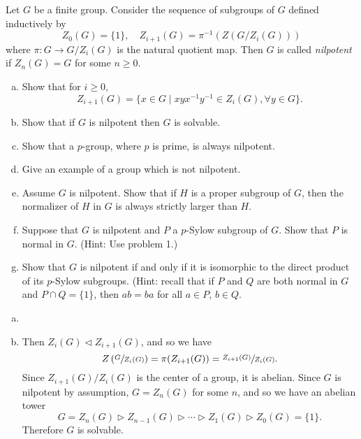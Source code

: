 \documentclass{article}
\newcounter{Problem}
\newenvironment{Problem}{\begin{Exercise}[name={Problem},
                                          counter={Problem}]}
                        {\end{Exercise}}
\begin{document}
\begin{Problem}
Let $G$ be a finite group. Consider the sequence of subgroups of $G$
defined inductively by
$$
Z_0(G) = \{ 1 \}, \quad
Z_{i+1}(G) = \pi^{-1}(Z(G/Z_i(G)))
$$
where $\pi : G \to G / Z_i(G)$ is the natural quotient map. Then $G$
is called \emph{nilpotent} if $Z_n(G) = G$ for some $n \geq 0$.

\begin{enumerate}[(a)]
  \item{
    Show that for $i \geq 0$,
    $$
    Z_{i+1}(G) = \{ x \in G
                   \mid
                   xyx^{-1}y^{-1} \in Z_i(G), \forall y \in G
                \}.
    $$
  }
  \item{
    Show that if $G$ is nilpotent then $G$ is solvable.
  }
  \item{
    Show that a $p$-group, where $p$ is prime, is always nilpotent.
  }
  \item{
    Give an example of a group which is not nilpotent.
  }
  \item{
    Assume $G$ is nilpotent. Show that if $H$ is a proper subgroup of $G$, then
    the normalizer of $H$ in $G$ is always strictly larger than $H$.
  }
  \item{
    Suppose that $G$ is nilpotent and $P$ a $p$-Sylow subgroup of
    $G$. Show that $P$ is normal in $G$. (Hint: Use problem 1.)
  }
  \item{
    Show that $G$ is nilpotent if and only if it is isomorphic to the
    direct product of its $p$-Sylow subgroups. (Hint: recall that if
    $P$ and $Q$ are both normal in $G$ and $P \cap Q = \{ 1 \}$, then
    $ab = ba$ for all $a \in P$, $b \in Q$.
  }
\end{enumerate}
\end{Problem}

\begin{Answer}
\begin{enumerate}[(a)]
  \item{
  }
  \item{


    Then $Z_{i}(G) \triangleleft Z_{i+1}(G)$, and so we have
    $$
      Z\left(\sfrac{G}{Z_{i}(G)}\right)
    = \pi(Z_{i+1}(G))
    = \sfrac{Z_{i+1}(G)}{Z_{i}(G)}.
    $$
    Since $Z_{i+1}(G) / Z_{i}(G)$ is the center of a group, it is
    abelian. Since $G$ is nilpotent by assumption, $G = Z_n(G)$ for
    some $n$, and so we have an abelian tower
    $$
    G = Z_n(G)
    \triangleright Z_{n-1}(G)
    \triangleright \cdots
    \triangleright Z_1(G)
    \triangleright Z_0(G) = \{ 1 \}.
    $$
    Therefore $G$ is solvable.
  }
\end{enumerate}
\end{Answer}
\end{document}
